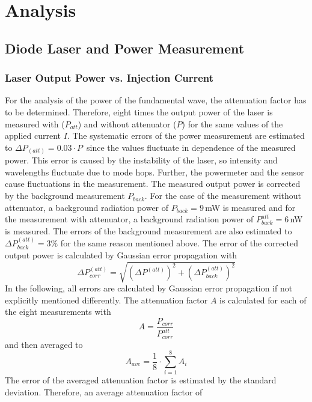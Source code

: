 \documentclass[10pt, a4paper, notitlepage, DIV=15]{scrartcl}
\begin{document}
\section{Analysis}
\subsection{Diode Laser and Power Measurement}
\subsubsection{Laser Output Power vs. Injection Current} \label{threshold_current}
For the analysis of the power of the fundamental wave, the attenuation factor has to be determined. Therefore, eight times the output power of the laser is measured with ($P_{att}$) and without attenuator ($P$) for the same values of the applied current $I$. The systematic errors of the power measurement are estimated to $\Delta P_{(att)} = 0.03 \cdot P\,$ since the values fluctuate in dependence of the measured power. This error is caused by the instability of the laser, so intensity and wavelengths fluctuate due to mode hops. Further, the powermeter and the sensor cause fluctuations in the measurement. The measured output power is corrected by the background measurement $P_{back}$. For the case of the measurement without attenuator, a background radiation power of $P_{back}=9\,$mW is measured and for the measurement with attenuator, a background radiation power of $P_{back}^{att}=6\,$nW is measured. The errors of the background measurement are also estimated to $\Delta P_{back}^{(att)}=3\%$ for the same reason mentioned above. The error of the corrected output power is calculated by Gaussian error propagation with 
\begin{equation}
	\Delta P_{corr}^{(att)}= \sqrt{\left(\Delta P^{(att)} \right) ^2 + \left(\Delta P_{back}^{(att)} \right) ^2}
\end{equation}
In the following, all errors are calculated by Gaussian error propagation if not explicitly mentioned differently. The attenuation factor $A$ is calculated for each of the eight measurements with
\begin{equation}
	A=\frac{P_{corr}}{P_{corr}^{att}}
\end{equation}
and then averaged to
\begin{equation}
	A_{ave}=\frac{1}{8}\cdot\sum_{i=1}^{8}A_i
\end{equation}
The error of the averaged attenuation factor is estimated by the standard deviation. Therefore, an average attenuation factor of
\end{document}

